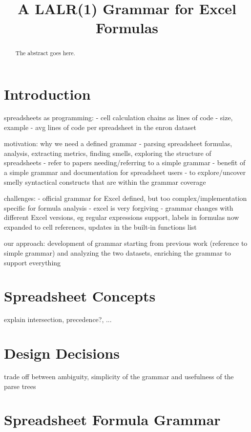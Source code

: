 \documentclass[conference]{IEEEtran}
\begin{document}
\title{A LALR(1) Grammar for Excel Formulas}

\maketitle


\begin{abstract}

The abstract goes here.
\end{abstract}

\IEEEpeerreviewmaketitle


\section{Introduction}

spreadsheets as programming:
- cell calculation chains as lines of code - size, example
- avg lines of code per spreadsheet in the enron dataset

motivation: why we need a defined grammar
- parsing spreadsheet formulas, analysis, extracting metrics, finding smells, exploring the structure of spreadsheets
- refer to papers needing/referring to a simple grammar
- benefit of a simple grammar and documentation for spreadsheet users
- to explore/uncover smelly syntactical constructs that are within the grammar coverage

challenges:
- official grammar for Excel defined, but too complex/implementation specific for formula analysis
- excel is very forgiving
- grammar changes with different Excel versions, eg regular expressions support, labels in formulas now expanded to cell
references, updates in the built-in functions list

our approach:
development of grammar starting from previous work (reference to simple grammar) and analyzing the two datasets, enriching the
grammar to support everything

\section{Spreadsheet Concepts}
explain intersection, precedence?, ...

\section{Design Decisions}
trade off between ambiguity, simplicity of the grammar and usefulness of the parse trees

\section{Spreadsheet Formula Grammar}
\end{document}
